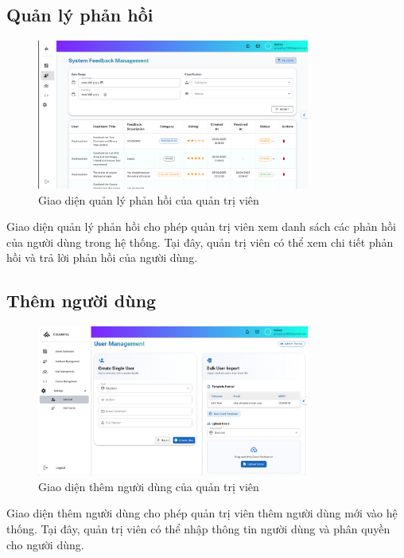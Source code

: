 \subsection{Quản lý phản hồi}
\begin{figure}[H]
    \centering
    \includegraphics[width=0.8\textwidth]{images/CapScreen_Admin/feedback.png}
    \caption{Giao diện quản lý phản hồi của quản trị viên}
    \label{fig:admin_feedback_page}
\end{figure}
Giao diện quản lý phản hồi cho phép quản trị viên xem danh sách các phản hồi của người dùng trong hệ thống. Tại đây, quản trị viên có thể xem chi tiết phản hồi và trả lời phản hồi của người dùng.
\subsection{Thêm người dùng}
\begin{figure}[H]
    \centering
    \includegraphics[width=0.8\textwidth]{images/CapScreen_Admin/adduser.png}
    \caption{Giao diện thêm người dùng của quản trị viên}
    \label{fig:admin_add_user_page}
\end{figure}
Giao diện thêm người dùng cho phép quản trị viên thêm người dùng mới vào hệ thống. Tại đây, quản trị viên có thể nhập thông tin người dùng và phân quyền cho người dùng.
